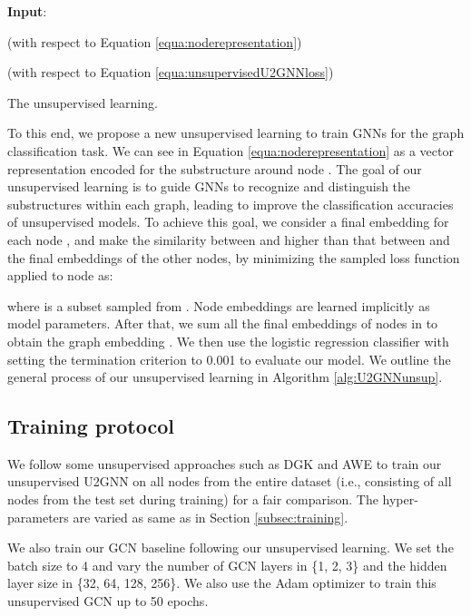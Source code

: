 \documentclass[twoside,leqno,twocolumn]{article}
\newcommand{\citep}{\cite}
\begin{document}
\begin{algorithm}
\DontPrintSemicolon
\SetAlgoVlined
\textbf{Input}: 

\For{}{
    \For{}{
    
        
    }
}

 (with respect to Equation \ref{equa:noderepresentation})

 (with respect to Equation \ref{equa:unsupervisedU2GNNloss})



\caption{The unsupervised learning.}
\label{alg:U2GNNunsup}
\end{algorithm}

To this end, we propose a new unsupervised learning to train GNNs for the graph classification task.
We can see  in Equation \ref{equa:noderepresentation} as a vector representation encoded for the substructure around node .
The goal of our unsupervised learning is to guide GNNs to recognize and distinguish the substructures within each graph, leading to improve the classification accuracies of unsupervised models.
To achieve this goal, we consider a final embedding  for each node , and make the similarity between  and  higher than that between  and the final embeddings of the other nodes, by minimizing the sampled  loss function \citep{Jean2015} applied to node  as:

where  is a subset sampled from . 
Node embeddings  are learned implicitly as model parameters.
After that, we sum all the final embeddings  of nodes  in  to obtain the graph embedding . 
We then use the logistic regression classifier \citep{Fan:2008} with setting the termination criterion to 0.001 to evaluate our model. 
We outline the general process of our unsupervised learning in Algorithm \ref{alg:U2GNNunsup}. 



\subsection{Training protocol} 

We follow some unsupervised approaches such as DGK \citep {yanardag2015deep} and AWE \citep{ivanov2018anonymous} to train our unsupervised U2GNN on all nodes from the entire dataset (i.e., consisting of all nodes from the test set during training) for a fair comparison. The hyper-parameters are varied as same as in Section \ref{subsec:training}.

We also train our GCN baseline following our unsupervised learning.
We set the batch size to 4 and vary the number of GCN layers in \{1, 2, 3\} and the hidden layer size in \{32, 64, 128, 256\}. We also use the Adam optimizer \citep{kingma2014adam} to train this unsupervised GCN up to 50 epochs.
\end{document}
